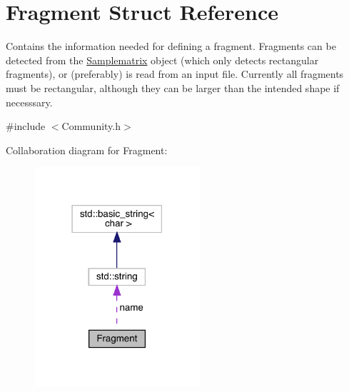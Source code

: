 \hypertarget{struct_fragment}{}\section{Fragment Struct Reference}
\label{struct_fragment}


Contains the information needed for defining a fragment. Fragments can be detected from the \hyperlink{class_samplematrix}{Samplematrix} object (which only detects rectangular fragments), or (preferably) is read from an input file. Currently all fragments must be rectangular, although they can be larger than the intended shape if necesssary.  




{\ttfamily \#include $<$Community.\+h$>$}



Collaboration diagram for Fragment\+:\nopagebreak
\begin{figure}[H]
\begin{center}
\leavevmode
\includegraphics[width=174pt]{struct_fragment__coll__graph}
\end{center}
\end{figure}
